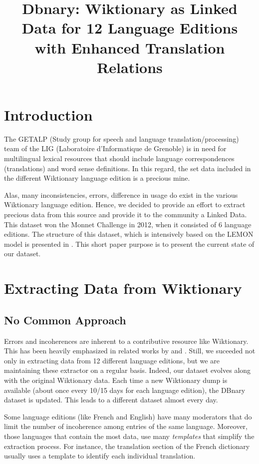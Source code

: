 \documentclass[10pt, a4paper]{article}
\title{Dbnary: Wiktionary as Linked Data for 12 Language Editions with Enhanced Translation Relations}
\date{}
\begin{document}
\maketitleabstract

\section{Introduction}

The GETALP (Study group for speech and language translation/processing) team of the LIG (Laboratoire d'Informatique de Grenoble) is in need for multilingual lexical resources that should include language correspondences (translations) and word sense definitions. In this regard, the set data included in the different Wiktionary language edition is a precious mine.

Alas, many inconsistencies, errors, difference in usage do exist in the various Wiktionary language edition. Hence, we decided to provide an effort to extract precious data from this source and provide it to the community a Linked Data. This dataset won the Monnet Challenge in 2012, when it consisted of 6 language editions. The structure of this dataset, which is intensively based on the LEMON model \cite{Mccrae:2012:ILR:2423739.2423818} is presented in \cite{serasset:dbnary-swj}. This short paper purpose is to present the current state of our dataset.

\section{Extracting Data from Wiktionary}

\subsection{No Common Approach}

Errors and incoherences are inherent to a contributive resource like Wiktionary. This has been heavily emphasized in related works by \cite{HellmannSebastianandBrekleJonasandAuer} and \cite{TUD-CS-2012-0008}. Still, we suceeded not only in extracting data from 12 different language editions, but we are maintaining these extractor on a regular basis. Indeed, our dataset evolves along with the original Wiktionary data. Each time a new Wiktionary dump is available (about once every 10/15 days for each language edition), the DBnary dataset is updated. This leads to a different dataset almost every day.

Some language editions (like French and English) have many moderators that do limit the number of incoherence among entries of the same language. Moreover, those languages that contain the most data, use many \textit{templates} that simplify the extraction process. For instance, the translation section of the French dictionary usually uses a template to identify each individual translation.
\end{document}
